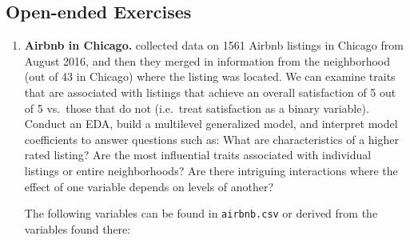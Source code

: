 \documentclass[
]{krantz}
\begin{document}
\hypertarget{open-ended-exercises-3}{%
\subsection{Open-ended Exercises}\label{open-ended-exercises-3}}

\begin{enumerate}
\def\labelenumi{\arabic{enumi}.}
\item
  \textbf{Airbnb in Chicago.} \citet{Trinh2018} collected data on 1561 Airbnb listings in Chicago from August 2016, and then they merged in information from the neighborhood (out of 43 in Chicago) where the listing was located. We can examine traits that are associated with listings that achieve an overall satisfaction of 5 out of 5 vs.~those that do not (i.e.~treat satisfaction as a binary variable). Conduct an EDA, build a multilevel generalized model, and interpret model coefficients to answer questions such as: What are characteristics of a higher rated listing? Are the most influential traits associated with individual listings or entire neighborhoods? Are there intriguing interactions where the effect of one variable depends on levels of another?

  The following variables can be found in \texttt{airbnb.csv} or derived from the variables found there:


\end{enumerate}
\end{document}
